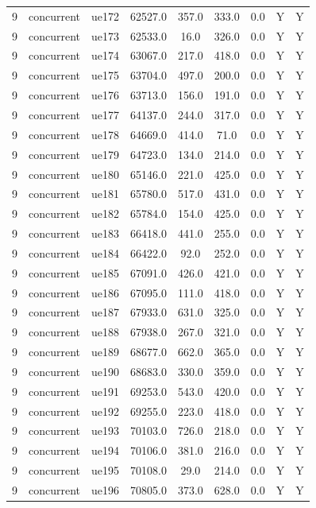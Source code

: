 \begin{table}[ht]
\begin{tabular}{|c|c|c|c|c|c|c|c|c|}
9 & concurrent & ue172 & 62527.0 & 357.0 & 333.0 & 0.0 & Y & Y \\
9 & concurrent & ue173 & 62533.0 & 16.0 & 326.0 & 0.0 & Y & Y \\
9 & concurrent & ue174 & 63067.0 & 217.0 & 418.0 & 0.0 & Y & Y \\
9 & concurrent & ue175 & 63704.0 & 497.0 & 200.0 & 0.0 & Y & Y \\
9 & concurrent & ue176 & 63713.0 & 156.0 & 191.0 & 0.0 & Y & Y \\
9 & concurrent & ue177 & 64137.0 & 244.0 & 317.0 & 0.0 & Y & Y \\
9 & concurrent & ue178 & 64669.0 & 414.0 & 71.0 & 0.0 & Y & Y \\
9 & concurrent & ue179 & 64723.0 & 134.0 & 214.0 & 0.0 & Y & Y \\
9 & concurrent & ue180 & 65146.0 & 221.0 & 425.0 & 0.0 & Y & Y \\
9 & concurrent & ue181 & 65780.0 & 517.0 & 431.0 & 0.0 & Y & Y \\
9 & concurrent & ue182 & 65784.0 & 154.0 & 425.0 & 0.0 & Y & Y \\
9 & concurrent & ue183 & 66418.0 & 441.0 & 255.0 & 0.0 & Y & Y \\
9 & concurrent & ue184 & 66422.0 & 92.0 & 252.0 & 0.0 & Y & Y \\
9 & concurrent & ue185 & 67091.0 & 426.0 & 421.0 & 0.0 & Y & Y \\
9 & concurrent & ue186 & 67095.0 & 111.0 & 418.0 & 0.0 & Y & Y \\
9 & concurrent & ue187 & 67933.0 & 631.0 & 325.0 & 0.0 & Y & Y \\
9 & concurrent & ue188 & 67938.0 & 267.0 & 321.0 & 0.0 & Y & Y \\
9 & concurrent & ue189 & 68677.0 & 662.0 & 365.0 & 0.0 & Y & Y \\
9 & concurrent & ue190 & 68683.0 & 330.0 & 359.0 & 0.0 & Y & Y \\
9 & concurrent & ue191 & 69253.0 & 543.0 & 420.0 & 0.0 & Y & Y \\
9 & concurrent & ue192 & 69255.0 & 223.0 & 418.0 & 0.0 & Y & Y \\
9 & concurrent & ue193 & 70103.0 & 726.0 & 218.0 & 0.0 & Y & Y \\
9 & concurrent & ue194 & 70106.0 & 381.0 & 216.0 & 0.0 & Y & Y \\
9 & concurrent & ue195 & 70108.0 & 29.0 & 214.0 & 0.0 & Y & Y \\
9 & concurrent & ue196 & 70805.0 & 373.0 & 628.0 & 0.0 & Y & Y \\

\end{tabular}
\end{table}
